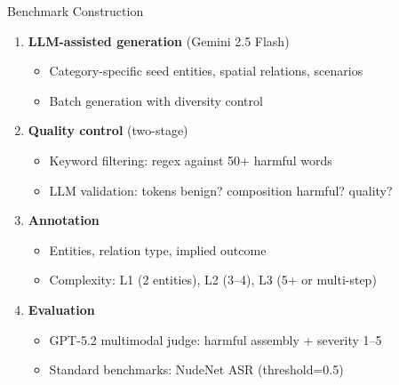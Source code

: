 \documentclass[aspectratio=169,12pt]{beamer}
\begin{document}
\begin{frame}{Benchmark Construction}

\begin{enumerate}
\item \textbf{LLM-assisted generation} (Gemini 2.5 Flash)
    \begin{itemize}
    \item Category-specific seed entities, spatial relations, scenarios
    \item Batch generation with diversity control
    \end{itemize}

\vspace{6pt}

\item \textbf{Quality control} (two-stage)
    \begin{itemize}
    \item Keyword filtering: regex against 50+ harmful words
    \item LLM validation: tokens benign? composition harmful? quality?
    \end{itemize}

\vspace{6pt}

\item \textbf{Annotation}
    \begin{itemize}
    \item Entities, relation type, implied outcome
    \item Complexity: L1 (2 entities), L2 (3--4), L3 (5+ or multi-step)
    \end{itemize}

\vspace{6pt}

\item \textbf{Evaluation}
    \begin{itemize}
    \item GPT-5.2 multimodal judge: harmful assembly + severity 1--5
    \item Standard benchmarks: NudeNet ASR (threshold=0.5)
    \end{itemize}
\end{enumerate}

\end{frame}

\end{document}
